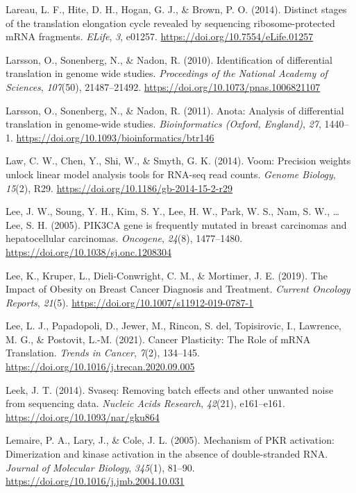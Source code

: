 \documentclass[12pt,openany]{book}
\begin{document}
\hypertarget{ref-Lareau2014}{}
Lareau, L. F., Hite, D. H., Hogan, G. J., \& Brown, P. O. (2014).
Distinct stages of the translation elongation cycle revealed by
sequencing ribosome-protected mRNA fragments. \emph{ELife}, \emph{3},
e01257. \url{https://doi.org/10.7554/eLife.01257}

\hypertarget{ref-Larsson2010}{}
Larsson, O., Sonenberg, N., \& Nadon, R. (2010). Identification of
differential translation in genome wide studies. \emph{Proceedings of
the National Academy of Sciences}, \emph{107}(50), 21487--21492.
\url{https://doi.org/10.1073/pnas.1006821107}

\hypertarget{ref-Larsson2011}{}
Larsson, O., Sonenberg, N., \& Nadon, R. (2011). Anota: Analysis of
differential translation in genome-wide studies. \emph{Bioinformatics
(Oxford, England)}, \emph{27}, 1440--1.
\url{https://doi.org/10.1093/bioinformatics/btr146}

\hypertarget{ref-Law2014}{}
Law, C. W., Chen, Y., Shi, W., \& Smyth, G. K. (2014). Voom: Precision
weights unlock linear model analysis tools for RNA-seq read counts.
\emph{Genome Biology}, \emph{15}(2), R29.
\url{https://doi.org/10.1186/gb-2014-15-2-r29}

\hypertarget{ref-Lee2005}{}
Lee, J. W., Soung, Y. H., Kim, S. Y., Lee, H. W., Park, W. S., Nam, S.
W., \ldots{} Lee, S. H. (2005). PIK3CA gene is frequently mutated in
breast carcinomas and hepatocellular carcinomas. \emph{Oncogene},
\emph{24}(8), 1477--1480. \url{https://doi.org/10.1038/sj.onc.1208304}

\hypertarget{ref-Lee2019}{}
Lee, K., Kruper, L., Dieli-Conwright, C. M., \& Mortimer, J. E. (2019).
The Impact of Obesity on Breast Cancer Diagnosis and Treatment.
\emph{Current Oncology Reports}, \emph{21}(5).
\url{https://doi.org/10.1007/s11912-019-0787-1}

\hypertarget{ref-Lee2021}{}
Lee, L. J., Papadopoli, D., Jewer, M., Rincon, S. del, Topisirovic, I.,
Lawrence, M. G., \& Postovit, L.-M. (2021). Cancer Plasticity: The Role
of mRNA Translation. \emph{Trends in Cancer}, \emph{7}(2), 134--145.
\url{https://doi.org/10.1016/j.trecan.2020.09.005}

\hypertarget{ref-Leek2014}{}
Leek, J. T. (2014). Svaseq: Removing batch effects and other unwanted
noise from sequencing data. \emph{Nucleic Acids Research},
\emph{42}(21), e161--e161. \url{https://doi.org/10.1093/nar/gku864}

\hypertarget{ref-Lemaire2005}{}
Lemaire, P. A., Lary, J., \& Cole, J. L. (2005). Mechanism of PKR
activation: Dimerization and kinase activation in the absence of
double-stranded RNA. \emph{Journal of Molecular Biology}, \emph{345}(1),
81--90. \url{https://doi.org/10.1016/j.jmb.2004.10.031}
\end{document}
